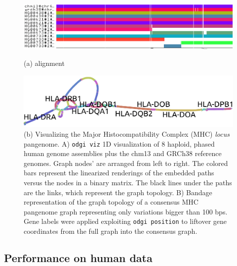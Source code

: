\documentclass{bioinfo}
\begin{document}
    \begin{figure}
        \begin{minipage}[b]{0.48\textwidth}
            \includegraphics[width=\linewidth]{fig/mhc-align.eps}
            \caption{(a) alignment}
            \label{fig:1}
        \end{minipage}

        \begin{minipage}[b]{0.48\textwidth}
            \includegraphics[width=\linewidth]{fig/mhc-pangenome.eps}
            \caption{(b) Visualizing the Major Histocompatibility Complex
                (MHC) \textit{locus} pangenome. A) \texttt{odgi viz} 1D visualization
                of 8 haploid, phased human genome assemblies plus the chm13
                and GRCh38 reference genomes. Graph nodes’ are arranged
                from left to right. The colored bars represent the
                linearized renderings of the embedded paths versus the nodes
                in a binary matrix. The black lines under the paths are the
                links, which represent the graph topology. B)
                Bandage~\citep{26099265} representation of the graph
                topology of a consensus MHC pangenome graph representing
                only variations bigger than 100 bps. Gene labels were
                applied exploiting \texttt{odgi position} to liftover gene
                coordinates from the full graph into the consensus graph.  }

            \label{fig:2}
        \end{minipage}
    \end{figure}

    \subsection{Performance on human data}
\end{document}

